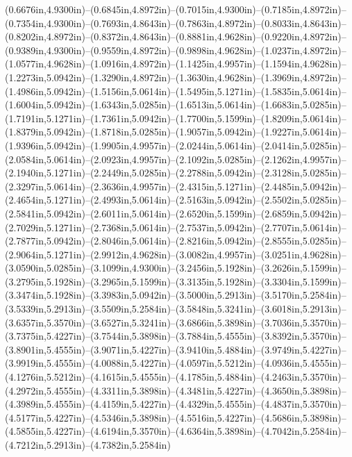 (0.6676in,4.9300in)--(0.6845in,4.8972in)--(0.7015in,4.9300in)--(0.7185in,4.8972in)--(0.7354in,4.9300in)--(0.7693in,4.8643in)--(0.7863in,4.8972in)--(0.8033in,4.8643in)--(0.8202in,4.8972in)--(0.8372in,4.8643in)--(0.8881in,4.9628in)--(0.9220in,4.8972in)--(0.9389in,4.9300in)--(0.9559in,4.8972in)--(0.9898in,4.9628in)--(1.0237in,4.8972in)--(1.0577in,4.9628in)--(1.0916in,4.8972in)--(1.1425in,4.9957in)--(1.1594in,4.9628in)--(1.2273in,5.0942in)--(1.3290in,4.8972in)--(1.3630in,4.9628in)--(1.3969in,4.8972in)--(1.4986in,5.0942in)--(1.5156in,5.0614in)--(1.5495in,5.1271in)--(1.5835in,5.0614in)--(1.6004in,5.0942in)--(1.6343in,5.0285in)--(1.6513in,5.0614in)--(1.6683in,5.0285in)--(1.7191in,5.1271in)--(1.7361in,5.0942in)--(1.7700in,5.1599in)--(1.8209in,5.0614in)--(1.8379in,5.0942in)--(1.8718in,5.0285in)--(1.9057in,5.0942in)--(1.9227in,5.0614in)--(1.9396in,5.0942in)--(1.9905in,4.9957in)--(2.0244in,5.0614in)--(2.0414in,5.0285in)--(2.0584in,5.0614in)--(2.0923in,4.9957in)--(2.1092in,5.0285in)--(2.1262in,4.9957in)--(2.1940in,5.1271in)--(2.2449in,5.0285in)--(2.2788in,5.0942in)--(2.3128in,5.0285in)--(2.3297in,5.0614in)--(2.3636in,4.9957in)--(2.4315in,5.1271in)--(2.4485in,5.0942in)--(2.4654in,5.1271in)--(2.4993in,5.0614in)--(2.5163in,5.0942in)--(2.5502in,5.0285in)--(2.5841in,5.0942in)--(2.6011in,5.0614in)--(2.6520in,5.1599in)--(2.6859in,5.0942in)--(2.7029in,5.1271in)--(2.7368in,5.0614in)--(2.7537in,5.0942in)--(2.7707in,5.0614in)--(2.7877in,5.0942in)--(2.8046in,5.0614in)--(2.8216in,5.0942in)--(2.8555in,5.0285in)--(2.9064in,5.1271in)--(2.9912in,4.9628in)--(3.0082in,4.9957in)--(3.0251in,4.9628in)--(3.0590in,5.0285in)--(3.1099in,4.9300in)--(3.2456in,5.1928in)--(3.2626in,5.1599in)--(3.2795in,5.1928in)--(3.2965in,5.1599in)--(3.3135in,5.1928in)--(3.3304in,5.1599in)--(3.3474in,5.1928in)--(3.3983in,5.0942in)--(3.5000in,5.2913in)--(3.5170in,5.2584in)--(3.5339in,5.2913in)--(3.5509in,5.2584in)--(3.5848in,5.3241in)--(3.6018in,5.2913in)--(3.6357in,5.3570in)--(3.6527in,5.3241in)--(3.6866in,5.3898in)--(3.7036in,5.3570in)--(3.7375in,5.4227in)--(3.7544in,5.3898in)--(3.7884in,5.4555in)--(3.8392in,5.3570in)--(3.8901in,5.4555in)--(3.9071in,5.4227in)--(3.9410in,5.4884in)--(3.9749in,5.4227in)--(3.9919in,5.4555in)--(4.0088in,5.4227in)--(4.0597in,5.5212in)--(4.0936in,5.4555in)--(4.1276in,5.5212in)--(4.1615in,5.4555in)--(4.1785in,5.4884in)--(4.2463in,5.3570in)--(4.2972in,5.4555in)--(4.3311in,5.3898in)--(4.3481in,5.4227in)--(4.3650in,5.3898in)--(4.3989in,5.4555in)--(4.4159in,5.4227in)--(4.4329in,5.4555in)--(4.4837in,5.3570in)--(4.5177in,5.4227in)--(4.5346in,5.3898in)--(4.5516in,5.4227in)--(4.5686in,5.3898in)--(4.5855in,5.4227in)--(4.6194in,5.3570in)--(4.6364in,5.3898in)--(4.7042in,5.2584in)--(4.7212in,5.2913in)--(4.7382in,5.2584in) 